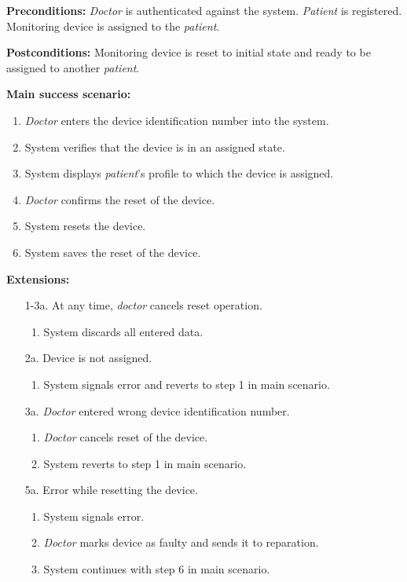 \documentclass[fontsize=12pt,
               paper=a4,
               twoside=false,
               parskip=half,
               ]{scrartcl}
\begin{document}
\textbf{\textsf{Preconditions:}} \emph{Doctor} is authenticated against the system. \emph{Patient} is registered. Monitoring device is assigned to the \emph{patient}.

\textbf{\textsf{Postconditions:}} Monitoring device is reset to initial state and ready to be assigned to another \emph{patient}.

\textbf{\textsf{Main success scenario:}}

\begin{enumerate}[leftmargin=3em]
	\item \emph{Doctor} enters the device identification number into the system.
	\item System verifies that the device is in an assigned state.
	\item System displays \emph{patient}'s profile to which the device is assigned.
	\item \emph{Doctor} confirms the reset of the device.
	\item System resets the device.
	\item System saves the reset of the device.
\end{enumerate}

\textbf{\textsf{Extensions:}}

\begin{itemize}[leftmargin=3em]
	\item[1-3a.] At any time, \emph{doctor} cancels reset operation.
	\begin{enumerate}
		\item System discards all entered data.
	\end{enumerate}
	\item[2a.] Device is not assigned.
	\begin{enumerate}
		\item System signals error and reverts to step 1 in main scenario.
	\end{enumerate}
	\item[3a.] \emph{Doctor} entered wrong device identification number.
	\begin{enumerate}
		\item \emph{Doctor} cancels reset of the device.
		\item System reverts to step 1 in main scenario.
	\end{enumerate}
	\item[5a.] Error while resetting the device.
	\begin{enumerate}
		\item System signals error.
		\item \emph{Doctor} marks device as faulty and sends it to reparation.
		\item System continues with step 6 in main scenario.
	\end{enumerate}
\end{itemize}
\end{document}
